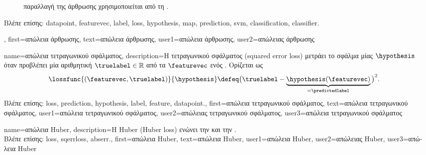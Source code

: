 {{\begin{figure}[H]
\begin{center}
{{{			παραλλαγή της}  \foreignlanguage{greek}{άρθρωσης χρησιμοποιείται από τη}  
			\cite{LampertNowKernel}.}\label{fig_hingeloss_dict}}
		\end{center}
		\end{figure} 
	    	\foreignlanguage{greek}{Βλέπε επίσης:} \gls{datapoint}, \gls{featurevec}, \gls{label}, \gls{loss}, \gls{hypothesis}, \gls{map}, 
		\gls{prediction}, \gls{svm}, \gls{classification}, \gls{classifier}.},
	first={\foreignlanguage{greek}{απώλεια άρθρωσης}},
	text={\foreignlanguage{greek}{απώλεια άρθρωσης}},
	user1={\foreignlanguage{greek}{απώλεια άρθρωσης}}, %
	user2={\foreignlanguage{greek}{απώλειας άρθρωσης}} %
}

{name={\foreignlanguage{greek}{απώλεια τετραγωνικού σφάλματος}},
	description={\foreignlanguage{greek}{Η} 
		 \foreignlanguage{greek}{τετραγωνικού σφάλματος} (squared error loss) \foreignlanguage{greek}{μετράει το 
		σφάλμα}  \foreignlanguage{greek}{μίας}  $\hypothesis$ \foreignlanguage{greek}{όταν 
		προβλέπει μία αριθμητική}  $\truelabel \in \mathbb{R}$ \foreignlanguage{greek}{από τα}  
		$\featurevec$ \foreignlanguage{greek}{ενός} . \foreignlanguage{greek}{Ορίζεται ως}  
		\begin{equation} 
			\nonumber
			\lossfunc{(\featurevec,\truelabel)}{\hypothesis} \defeq \big(\truelabel - \underbrace{\hypothesis(\featurevec)}_{=\predictedlabel} \big)^{2}. 
		\end{equation} 
		\foreignlanguage{greek}{Βλέπε επίσης:} \gls{loss}, \gls{prediction}, \gls{hypothesis}, \gls{label}, \gls{feature}, \gls{datapoint}.},
	first={\foreignlanguage{greek}{απώλεια τετραγωνικού σφάλματος}},
	text={\foreignlanguage{greek}{απώλεια τετραγωνικού σφάλματος}},
	user1={\foreignlanguage{greek}{απώλεια τετραγωνικού σφάλματος}}, %
	user2={\foreignlanguage{greek}{απώλειας τετραγωνικού σφάλματος}}, %
	user3={\foreignlanguage{greek}{απώλεια τετραγωνικού σφάλματος}} %
}

{name={\foreignlanguage{greek}{απώλεια} Huber}, 
	description={\foreignlanguage{greek}{Η} 
		 Huber (Huber loss) \foreignlanguage{greek}{ενώνει την}  
		\foreignlanguage{greek}{και την} .
		\\
		\foreignlanguage{greek}{Βλέπε επίσης:} \gls{loss}, \gls{sqerrloss}, \gls{abserr}.},
	first={\foreignlanguage{greek}{απώλεια} Huber},
	text={\foreignlanguage{greek}{απώλεια} Huber},
	user1={\foreignlanguage{greek}{απώλεια} Huber}, %
	user2={\foreignlanguage{greek}{απώλειας} Huber}, %
	user3={\foreignlanguage{greek}{απώλεια} Huber} %
}

